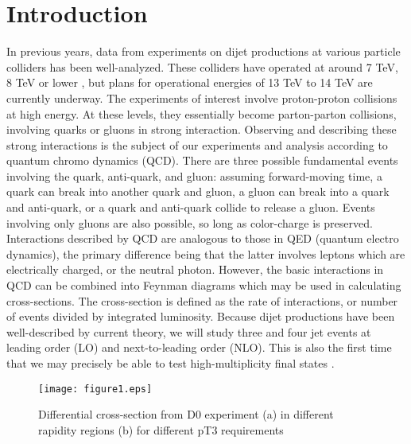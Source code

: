 \documentclass[aps,prl,preprint,groupedaddress]{revtex4}
\begin{document}
\section{Introduction \label {intro}}
  In previous years, data from experiments on dijet productions at various particle colliders has been well-analyzed. These colliders have operated at around 7 TeV, 8 TeV or lower \cite{Aad:2011tqa}, but plans for operational energies of 13 TeV to 14 TeV are currently underway. The experiments of interest involve proton-proton collisions at high energy. At these levels, they essentially become parton-parton collisions, involving quarks or gluons in strong interaction. Observing and describing these strong interactions is the subject of our experiments and analysis according to quantum chromo dynamics (QCD). There are three possible fundamental events involving the quark, anti-quark, and gluon: assuming forward-moving time, a quark can break into another quark and gluon, a gluon can break into a quark and anti-quark, or a quark and anti-quark collide to release a gluon. Events involving only gluons are also possible, so long as color-charge is preserved. Interactions described by QCD are analogous to those in QED (quantum electro dynamics), the primary difference being that the latter involves leptons which are electrically charged, or the neutral photon. However, the basic interactions in QCD can be combined into Feynman diagrams which may be used in calculating cross-sections. The cross-section is defined as the rate of interactions, or number of events divided by integrated luminosity. Because dijet productions have been well-described by current theory, we will study three and four jet events at leading order (LO) and next-to-leading order (NLO). This is also the first time that we may precisely be able to test high-multiplicity final states \cite{Abazov:2011ub}.

    \begin{figure*}
        \begin{centering}
        \texttt{[image: figure1.eps]}
        \caption[D0 Experiment.]{ Differential cross-section from D0 experiment (a) in different rapidity regions (b) for different pT3 requirements}
        \label{fig:D0}
        \end{centering}
    \end{figure*}


\end{document}
